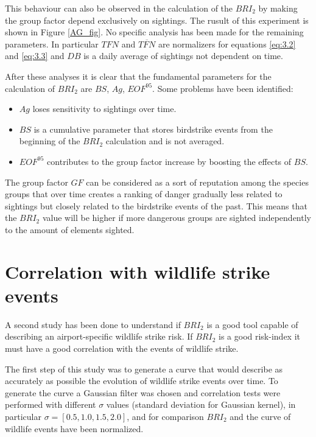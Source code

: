 This behaviour can also be observed in the calculation of the $BRI_2$ by making the group factor depend exclusively on sightings. The rusult of this experiment is shown in Figure \ref{AG_fig}.
No specific analysis has been made for the remaining parameters. In particular $TFN$ and $\overline{TFN}$ are normalizers for equations \ref{eq:3.2} and \ref{eq:3.3} and $DB$ is a daily average of sightings  not dependent on time.

After these analyses it is clear that the fundamental parameters for the calculation of $BRI_2$ are $BS$, $Ag$, $EOF^{95}$. Some problems have been identified:
\begin{itemize}
    \item $Ag$ loses sensitivity to sightings over time.
    \item  $BS$ is a cumulative parameter that stores birdstrike events from the beginning of the $BRI_2$ calculation and is not averaged.
    \item  $EOF^{95}$ contributes to the group factor increase by boosting the effects of $BS$.
\end{itemize}
The group factor $GF$ can be considered as a sort of reputation among the species groups that over time creates a ranking of danger gradually less related to sightings but closely related to the birdstrike events of the past.
This means that the $BRI_2$ value will be higher if more dangerous groups are sighted independently to the amount of elements sighted.

\section{Correlation with wildlife strike events}\label{smooth}
A second study has been done to understand if $BRI_2$ is a good
tool capable of describing an airport-specific wildlife strike risk.
If $BRI_2$ is a good risk-index it must have a good correlation with the events of wildlife strike.

The first step of this study was to generate a curve that would describe as accurately as possible the evolution of wildlife strike events over time.
To generate the curve a Gaussian filter was chosen and correlation tests were performed with different $\sigma$ values (standard deviation for Gaussian kernel), in particular $\sigma = [0.5, 1.0, 1.5, 2.0]$, and for comparison $BRI_2$ and the curve of wildlife events have been normalized.

